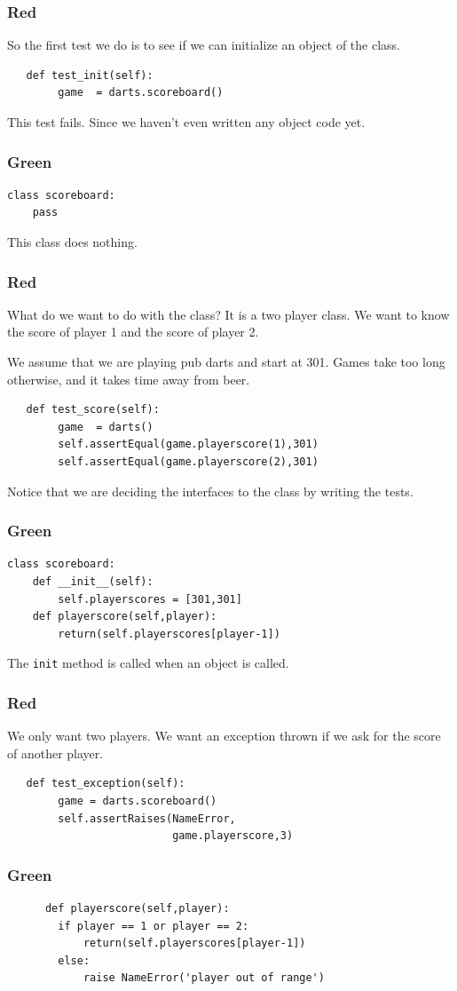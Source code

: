 \documentclass{beamer}
\begin{document}
\begin{frame}[fragile]
  \frametitle{Red}
So the first test we do is to see if we can initialize an object of
the class.

\begin{lstlisting}
   def test_init(self):
        game  = darts.scoreboard()
\end{lstlisting}
This test fails. Since we haven't even written any object code yet.
\end{frame}
\begin{frame}[fragile]
\frametitle{Green}
\begin{lstlisting}
class scoreboard:
    pass
\end{lstlisting}
This class does nothing.  
\end{frame}
\begin{frame}[fragile]
\frametitle{Red}
What do we want to do with the class? It is a two player class. We
want to know the score of player 1 and the score of player 2.

We assume that we are playing pub darts and start at 301. Games take
too long otherwise, and it takes time away from beer.
\begin{lstlisting}
   def test_score(self):
        game  = darts()
        self.assertEqual(game.playerscore(1),301)
        self.assertEqual(game.playerscore(2),301)
\end{lstlisting}
Notice that we are deciding the interfaces to the class by writing the tests.
\end{frame}
\begin{frame}[fragile]
\frametitle{Green}
\begin{lstlisting}
class scoreboard:
    def __init__(self):
        self.playerscores = [301,301]
    def playerscore(self,player):
        return(self.playerscores[player-1])
\end{lstlisting}
The {\tt init} method is called when an object is called.  
\end{frame}
\begin{frame}[fragile]
\frametitle{Red}
We only want two players. We want an exception thrown if we ask for
the score of another player.
\begin{lstlisting}
   def test_exception(self):
        game = darts.scoreboard()
        self.assertRaises(NameError,
                          game.playerscore,3)
\end{lstlisting}
\end{frame}

\begin{frame}[fragile]
\frametitle{Green}
\begin{lstlisting}
      def playerscore(self,player):
        if player == 1 or player == 2:
            return(self.playerscores[player-1])
        else:
            raise NameError('player out of range')
\end{lstlisting}
    
\end{frame}
\end{document}
